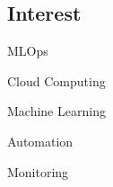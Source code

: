 \documentclass[../main.tex]{subfiles}
\begin{document}
\begin{category}
\section{Interest}
    \begin{enumerate*}[label=$\diamond$]
        \item MLOps \qquad \qquad
        \item Cloud Computing \qquad \qquad
        \item Machine Learning \qquad \qquad
        \item Automation \qquad \qquad
        \item Monitoring \qquad \qquad
    \end{enumerate*}
\end{category}
\end{document}
